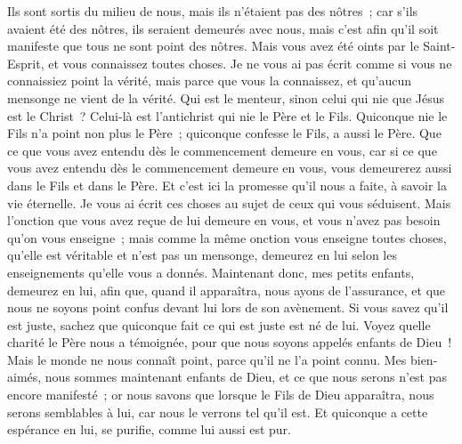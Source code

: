 \begin{multicols}{2}
Ils sont sortis du milieu de nous, mais ils n'étaient pas des nôtres~; car s'ils avaient été des nôtres, ils seraient demeurés avec nous, mais c'est afin qu'il soit manifeste que tous ne sont point des nôtres.
Mais vous avez été oints par le Saint-Esprit, et vous connaissez toutes choses.
Je ne vous ai pas écrit comme si vous ne connaissiez point la vérité, mais parce que vous la connaissez, et qu'aucun mensonge ne vient de la vérité.
Qui est le menteur, sinon celui qui nie que Jésus est le Christ~? Celui-là est l'antichrist qui nie le Père et le Fils.
Quiconque nie le Fils n'a point non plus le Père~; quiconque confesse le Fils, a aussi le Père.
Que ce que vous avez entendu dès le commencement demeure en vous, car si ce que vous avez entendu dès le commencement demeure en vous, vous demeurerez aussi dans le Fils et dans le Père.
Et c'est ici la promesse qu'il nous a faite, à savoir la vie éternelle.
Je vous ai écrit ces choses au sujet de ceux qui vous séduisent.
Mais l'onction que vous avez reçue de lui demeure en vous, et vous n'avez pas besoin qu'on vous enseigne~; mais comme la même onction vous enseigne toutes choses, qu'elle est véritable et n'est pas un mensonge, demeurez en lui selon les enseignements qu'elle vous a donnés.
Maintenant donc, mes petits enfants, demeurez en lui, afin que, quand il apparaîtra, nous ayons de l'assurance, et que nous ne soyons point confus devant lui lors de son avènement.
Si vous savez qu'il est juste, sachez que quiconque fait ce qui est juste est né de lui.
\VerseOne{}Voyez quelle charité le Père nous a témoignée, pour que nous soyons appelés enfants de Dieu~! Mais le monde ne nous connaît point, parce qu'il ne l'a point connu.
Mes bien-aimés, nous sommes maintenant enfants de Dieu, et ce que nous serons n'est pas encore manifesté~; or nous savons que lorsque le Fils de Dieu apparaîtra, nous serons semblables à lui, car nous le verrons tel qu'il est.
Et quiconque a cette espérance en lui, se purifie, comme lui aussi est pur.

\end{multicols}
